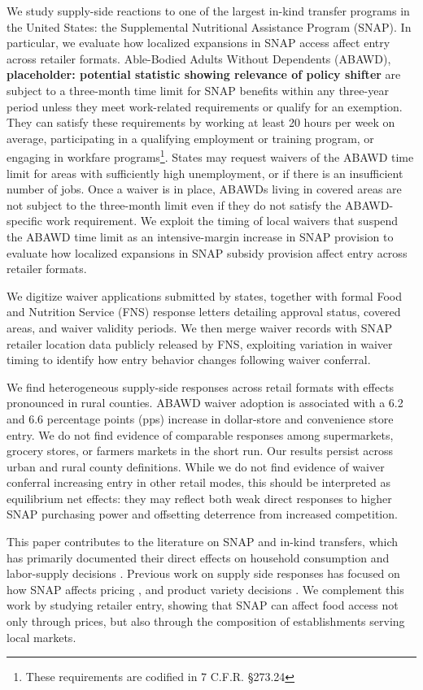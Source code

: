 \documentclass[12pt]{article}
\begin{document}
We study supply-side reactions to one of the largest in-kind transfer programs in the United States: the Supplemental Nutritional Assistance Program (SNAP). In particular, we evaluate how localized expansions in SNAP access affect entry across retailer formats. Able-Bodied Adults Without Dependents (ABAWD), \textbf{placeholder: potential statistic showing relevance of policy shifter} are subject to a three-month time limit for SNAP benefits within any three-year period unless they meet work-related requirements or qualify for an exemption. They can satisfy these requirements by working at least 20 hours per week on average, participating in a qualifying employment or training program, or engaging in workfare programs\footnote{These requirements are codified in 7 C.F.R. \S 273.24}. States may request waivers of the ABAWD time limit for areas with sufficiently high unemployment, or if there is an insufficient number of jobs. Once a waiver is in place, ABAWDs living in covered areas are not subject to the three-month limit even if they do not satisfy the ABAWD-specific work requirement. We exploit the timing of local waivers that suspend the  ABAWD  time limit as an intensive-margin increase in SNAP provision to evaluate how localized expansions in SNAP subsidy provision affect entry across retailer formats.

We digitize waiver applications submitted by states, together with formal Food and Nutrition Service (FNS) response letters detailing approval status, covered areas, and waiver validity periods. We then merge waiver records with SNAP retailer location data publicly released by FNS, exploiting variation in waiver timing to identify how entry behavior changes following waiver conferral. 

We find heterogeneous supply-side responses across retail formats with effects pronounced in rural counties. ABAWD waiver adoption is associated with a 6.2 and 6.6 percentage points (pps) increase in dollar-store and convenience store entry.  We do not find evidence of comparable responses among supermarkets, grocery stores, or farmers markets in the short run. Our results persist across urban and rural county definitions. While we do not find evidence of waiver conferral increasing entry in other retail modes, this should be interpreted as equilibrium net effects: they may reflect both weak direct responses to higher SNAP purchasing power and offsetting deterrence from increased competition.


This paper contributes to  the literature on SNAP and in-kind transfers, which has primarily documented their direct effects on household consumption \citep{hoynes2009consumption,ratcliffe2011snap,kim2016snap,hastings2018snap} and labor-supply decisions \citep{hoynes2012work,han2022impact,gray2023employed}. Previous work on supply side responses has focused on how SNAP affects pricing \citep{leung2023government}, and product variety decisions \citep{byrne2022welfare}. We complement this work by studying retailer entry, showing that SNAP can affect food access not only through prices, but also through the composition of establishments serving local markets.
\end{document}
